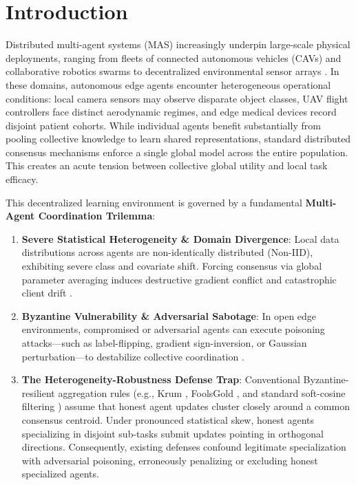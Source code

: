 \documentclass[sigconf]{acmart}
\begin{document}

\maketitle

\section{Introduction}

Distributed multi-agent systems (MAS) increasingly underpin large-scale physical deployments, ranging from fleets of connected autonomous vehicles (CAVs) and collaborative robotics swarms to decentralized environmental sensor arrays \cite{mcmahan2017communication, sabater2002regret}. In these domains, autonomous edge agents encounter heterogeneous operational conditions: local camera sensors may observe disparate object classes, UAV flight controllers face distinct aerodynamic regimes, and edge medical devices record disjoint patient cohorts. While individual agents benefit substantially from pooling collective knowledge to learn shared representations, standard distributed consensus mechanisms enforce a single global model across the entire population. This creates an acute tension between collective global utility and local task efficacy.

This decentralized learning environment is governed by a fundamental \textbf{Multi-Agent Coordination Trilemma}:
\begin{enumerate}
    \item \textbf{Severe Statistical Heterogeneity \& Domain Divergence}: Local data distributions across agents are non-identically distributed (Non-IID), exhibiting severe class and covariate shift. Forcing consensus via global parameter averaging induces destructive gradient conflict and catastrophic client drift \cite{karimireddy2020scaffold, sattler2020clustered}.
    \item \textbf{Byzantine Vulnerability \& Adversarial Sabotage}: In open edge environments, compromised or adversarial agents can execute poisoning attacks---such as label-flipping, gradient sign-inversion, or Gaussian perturbation---to destabilize collective coordination \cite{blanchard2017machine, yin2018byzantine, sun2019can}.
    \item \textbf{The Heterogeneity-Robustness Defense Trap}: Conventional Byzantine-resilient aggregation rules (e.g., Krum \cite{blanchard2017machine}, FoolsGold \cite{fung2020mitigating}, and standard soft-cosine filtering \cite{sun2019can}) assume that honest agent updates cluster closely around a common consensus centroid. Under pronounced statistical skew, honest agents specializing in disjoint sub-tasks submit updates pointing in orthogonal directions. Consequently, existing defenses confound legitimate specialization with adversarial poisoning, erroneously penalizing or excluding honest specialized agents.
\end{enumerate}
\end{document}
